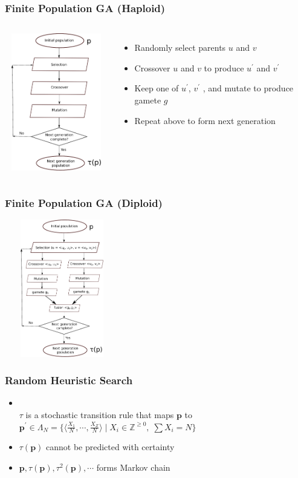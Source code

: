 \documentclass[aspectratio=169]{beamer}
\begin{document}
  \begin{frame}
    \frametitle{Finite Population GA (Haploid)}
    \begin{columns}
	  \centering
	  \includegraphics[height=6cm, width=5cm]{figures/eps/GA.eps}
	\begin{itemize}
	  \item{Randomly select parents $u$ and $v$ }
	  \item{Crossover $u$ and $v$ to produce $u^\prime$ and $v^\prime$ }
	  \item{Keep one of $u^\prime$, $v^\prime$ , and mutate to produce gamete $g$}
	  \item{Repeat above to form next generation}              
	\end{itemize}
    \end{columns} 
  \end{frame}
  
  \begin{frame}
    \frametitle{Finite Population GA (Diploid)}       
      \centering
      \includegraphics[height=6cm, width=5cm]{figures/eps/GA_dip.eps}          
  \end{frame}
  
  \begin{frame}
    \frametitle{ Random Heuristic Search}
    {
    \begin{itemize}    
      \item{ \mbox{}\\[-0.5in] $\tau$ is a stochastic transition rule that maps 
      $\bm{p}$ to $\bm{p^\prime} \in \Lambda_N = \{\langle \frac{X_1}{N},\cdots,\frac{X_Z}{N} \rangle \;|\; X_i \in \mathbb{Z}^{\geq 0},\; \sum X_i = N\}$}
      \item{$\tau(\bm{p})$ cannot be predicted with certainty }  
      \item{$\bm{p}, \tau(\bm{p}), \tau^2(\bm{p}), \cdots $ forms Markov chain}                
    \end{itemize}
    }
  \end{frame}
  
\end{document}
